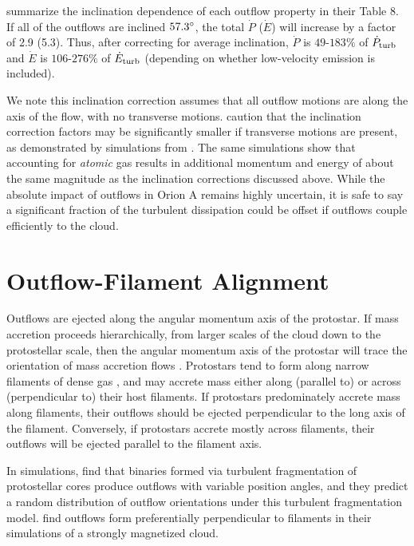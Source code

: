 \documentclass[twocolumn]{aastex63}
\begin{document}
\citet{Dunham14} summarize the inclination dependence of each outflow property in their Table 8. If all of the outflows are inclined $57.3\mbox{$^\circ$}$, the total $\dot P$ ($\dot E$) will increase by a factor of 2.9 (5.3). Thus, after correcting for average inclination, $\dot P$ is  $49$-$183\%$ of $\dot P_{\rm turb}$ and $\dot E$ is $106$-$276\%$ of $\dot E_{\rm turb}$ (depending on whether low-velocity emission is included).

We note this inclination correction assumes that all outflow motions are along the axis of the flow, with no transverse motions. \citet{Dunham14} caution that the inclination correction factors may be significantly smaller if transverse motions are present, as demonstrated by simulations from \citet{Downes07}. The same simulations show that accounting for \emph{atomic} gas results in additional momentum and energy of about the same magnitude as the inclination corrections discussed above. While the absolute impact of outflows in Orion A remains highly uncertain, it is safe to say a significant fraction of the turbulent dissipation could be offset if outflows couple efficiently to the cloud. %

\section{Outflow-Filament Alignment}\label{sec:filaments}
Outflows are ejected along the angular momentum axis of the protostar. If mass accretion proceeds hierarchically, from larger scales of the cloud down to the protostellar scale, then the angular momentum axis of the protostar will trace the orientation of mass accretion flows \citep{Bodenheimer95}. Protostars tend to form along narrow filaments of dense gas \citep{Arzoumanian11}, and may accrete mass either along (parallel to) or across (perpendicular to) their host filaments. If protostars predominately accrete mass along filaments, their outflows should be ejected perpendicular to the long axis of the filament. Conversely, if protostars accrete mostly across filaments, their outflows will be ejected parallel to the filament axis. 

In simulations, \citet{Offner16} find that binaries formed via turbulent fragmentation of protostellar cores produce outflows with variable position angles, and they predict a random distribution of outflow orientations under this turbulent fragmentation model. \citet{Li18} find outflows form preferentially perpendicular to filaments in their simulations of a strongly magnetized cloud. 
\end{document}
